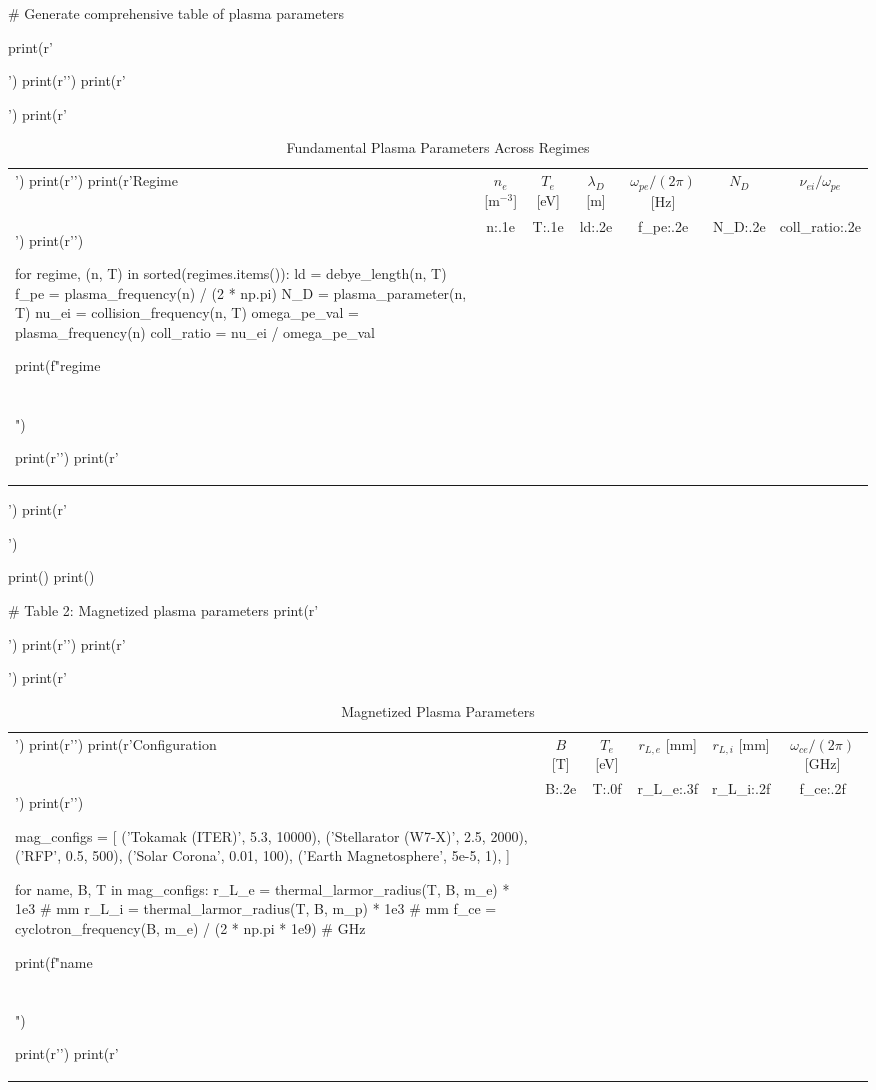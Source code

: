 \documentclass[11pt,a4paper]{article}
\begin{document}
\begin{pycode}
# Generate comprehensive table of plasma parameters

print(r'\begin{table}[H]')
print(r'\centering')
print(r'\caption{Fundamental Plasma Parameters Across Regimes}')
print(r'\begin{tabular}{@{}lcccccc@{}}')
print(r'\toprule')
print(r'Regime & $n_e$ [m$^{-3}$] & $T_e$ [eV] & $\lambda_D$ [m] & $\omega_{pe}/(2\pi)$ [Hz] & $N_D$ & $\nu_{ei}/\omega_{pe}$ \\')
print(r'\midrule')

for regime, (n, T) in sorted(regimes.items()):
    ld = debye_length(n, T)
    f_pe = plasma_frequency(n) / (2 * np.pi)
    N_D = plasma_parameter(n, T)
    nu_ei = collision_frequency(n, T)
    omega_pe_val = plasma_frequency(n)
    coll_ratio = nu_ei / omega_pe_val

    print(f"{regime} & {n:.1e} & {T:.1e} & {ld:.2e} & {f_pe:.2e} & {N_D:.2e} & {coll_ratio:.2e} \\\\")

print(r'\bottomrule')
print(r'\end{tabular}')
print(r'\end{table}')

print()
print()

# Table 2: Magnetized plasma parameters
print(r'\begin{table}[H]')
print(r'\centering')
print(r'\caption{Magnetized Plasma Parameters}')
print(r'\begin{tabular}{@{}lccccc@{}}')
print(r'\toprule')
print(r'Configuration & $B$ [T] & $T_e$ [eV] & $r_{L,e}$ [mm] & $r_{L,i}$ [mm] & $\omega_{ce}/(2\pi)$ [GHz] \\')
print(r'\midrule')

mag_configs = [
    ('Tokamak (ITER)', 5.3, 10000),
    ('Stellarator (W7-X)', 2.5, 2000),
    ('RFP', 0.5, 500),
    ('Solar Corona', 0.01, 100),
    ('Earth Magnetosphere', 5e-5, 1),
]

for name, B, T in mag_configs:
    r_L_e = thermal_larmor_radius(T, B, m_e) * 1e3  # mm
    r_L_i = thermal_larmor_radius(T, B, m_p) * 1e3  # mm
    f_ce = cyclotron_frequency(B, m_e) / (2 * np.pi * 1e9)  # GHz

    print(f"{name} & {B:.2e} & {T:.0f} & {r_L_e:.3f} & {r_L_i:.2f} & {f_ce:.2f} \\\\")

print(r'\bottomrule')
print(r'\end{tabular')
print(r'\end{table}')


\end{tabular}
\end{table}
\end{pycode}
\end{document}
